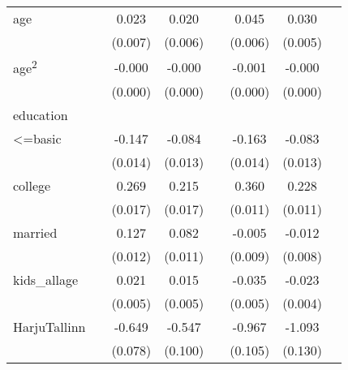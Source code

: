 {\begin{longtable}{l*{3}{c}|l*{3}{c}}
		age                 &                     &       0.023\sym{**} &       0.020\sym{**} &                     &       0.045\sym{***}&       0.030\sym{***}\\
		&                     &     (0.007)         &     (0.006)         &                     &     (0.006)         &     (0.005)         \\
		age\textsuperscript{2}    &                     &      -0.000\sym{***}&      -0.000\sym{***}&                     &      -0.001\sym{***}&      -0.000\sym{***}\\
		&                     &     (0.000)         &     (0.000)         &                     &     (0.000)         &     (0.000)         \\
		education &&&&&\\
		<=basic             &                     &      -0.147\sym{***}&      -0.084\sym{***}&                     &      -0.163\sym{***}&      -0.083\sym{***}\\
		&                     &     (0.014)         &     (0.013)         &                     &     (0.014)         &     (0.013)         \\
		college             &                     &       0.269\sym{***}&       0.215\sym{***}&                     &       0.360\sym{***}&       0.228\sym{***}\\
		&                     &     (0.017)         &     (0.017)         &                     &     (0.011)         &     (0.011)         \\
		married           &                     &       0.127\sym{***}&       0.082\sym{***}&                     &      -0.005         &      -0.012         \\
		&                     &     (0.012)         &     (0.011)         &                     &     (0.009)         &     (0.008)         \\
		kids\_allage         &                     &       0.021\sym{***}&       0.015\sym{**} &                     &      -0.035\sym{***}&      -0.023\sym{***}\\
		&                     &     (0.005)         &     (0.005)         &                     &     (0.005)         &     (0.004)         \\
		HarjuTallinn      &                     &      -0.649\sym{***}&      -0.547\sym{***}&                     &      -0.967\sym{***}&      -1.093\sym{***}\\
		&                     &     (0.078)         &     (0.100)         &                     &     (0.105)         &     (0.130)         \\

\end{longtable}}
